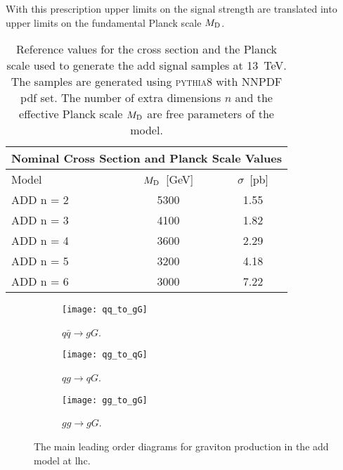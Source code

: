 With this prescription upper limits on the signal strength are translated into
upper limits on the fundamental Planck scale $M_\mathrm{D}$.
\begin{table}[!h]
  \centering
  \begin{tabular}{lcc}
    \toprule
    \multicolumn{3}{c}{Nominal Cross Section and Planck Scale Values} \\
    \midrule \midrule
    Model & $M_\mathrm{D}$~[GeV] & $\sigma$~[pb] \\
    \midrule
    ADD n = 2 & 5300 & 1.55 \\
    ADD n = 3 & 4100 & 1.82 \\
    ADD n = 4 & 3600 & 2.29 \\
    ADD n = 5 & 3200 & 4.18 \\
    ADD n = 6 & 3000 & 7.22 \\
    \bottomrule
  \end{tabular}
  \caption{Reference values for the cross section and the Planck scale used to
    generate the \gls{add} signal samples at 13~TeV. The samples are generated
    using \textsc{pythia8} with NNPDF \gls{pdf} set. The number of extra
    dimensions $n$ and the effective Planck scale $M_\mathrm{D}$ are free parameters of
    the model.}
  \label{tab:sigma_md_ref}
\end{table}
\begin{figure}[!h]
  \centering
  \begin{subfigure}{.3\linewidth}
    \texttt{[image: qq\_to\_gG]}
    \caption{$q \bar{q} \rightarrow g G$.}
  \end{subfigure}
  \begin{subfigure}{.3\linewidth}
    \texttt{[image: qg\_to\_qG]}
    \caption{$q g \rightarrow q G$.}
  \end{subfigure}
  \begin{subfigure}{.3\linewidth}
    \texttt{[image: gg\_to\_gG]}
    \caption{$g g \rightarrow g G$.}
  \end{subfigure}
  \caption{The main leading order diagrams for graviton production in the
    \gls{add} model at \gls{lhc}.}
  \label{fig:add_feynman}
\end{figure}

